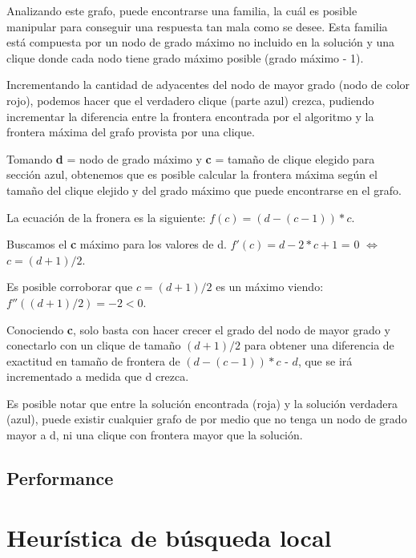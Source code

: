 \documentclass[a4paper, 10pt, twoside]{article}
\begin{document}
Analizando este grafo, puede encontrarse una familia, la cuál es posible manipular para conseguir una respuesta tan mala como se desee. Esta familia está compuesta por un nodo de grado máximo no incluido en la solución y una clique donde cada nodo tiene grado máximo posible (grado máximo - 1).

Incrementando la cantidad de adyacentes del nodo de mayor grado (nodo de color rojo), podemos hacer que el verdadero clique (parte azul) crezca, pudiendo incrementar la diferencia entre la frontera encontrada por el algoritmo y la frontera máxima del grafo provista por una clique.

Tomando \textbf{d} = nodo de grado máximo y \textbf{c} = tamaño de clique elegido para sección azul, obtenemos que es posible calcular la frontera máxima según el tamaño del clique elejido y del grado máximo que puede encontrarse en el grafo.

La ecuación de la fronera es la siguiente: $f(c) = (d - (c - 1)) * c$.

Buscamos el \textbf{c} máximo para los valores de d. $f'(c) = d - 2 * c + 1$ = 0 $\Leftrightarrow$ $c = (d + 1)/2$.

Es posible corroborar que $c = (d + 1)/2$ es un máximo viendo: $f''((d + 1)/2) = -2 < 0$.

Conociendo \textbf{c}, solo basta con hacer crecer el grado del nodo de mayor grado y conectarlo con un clique de tamaño $(d + 1)/2$ para obtener una diferencia de exactitud en tamaño de frontera de $(d - (c - 1)) * c$ - $d$, que se irá incrementado a medida que d crezca.

Es posible notar que entre la solución encontrada (roja) y la solución verdadera (azul), puede existir cualquier grafo de por medio que no tenga un nodo de grado mayor a d, ni una clique con frontera mayor que la solución.

\subsection{Performance}


\newpage

\section{Heurística de búsqueda local}
\end{document}
